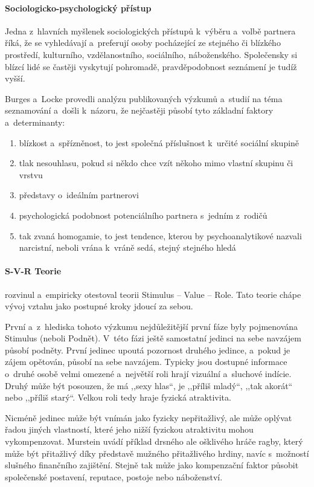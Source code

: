 \documentclass[a4paper, 12pt, notitlepage, oneside, numbers=noenddot]{report}
\begin{document}
\paragraph{Sociologicko-psychologický přístup}
Jedna z~hlavních myšlenek sociologických pří\-stu\-pů \citep{Planava1998}
k~výběru a~volbě partnera říká, že se vyhledávají a~preferují os\-oby
pocházející ze stejného či blízkého prostředí, kulturního,
vzdělanost\-ního, sociál\-ního, nábožen\-ského.  Společensky si blízcí lidé
se častěji vyskytují pohromadě, pravděpodobnost seznámení je tudíž
vyšší.

Burges a~Locke \citep{Planava1998} provedli analýzu publikovaných
výzkumů a~studií na téma seznamování a~došli k~názoru, že nejčastěji
působí tyto základní faktory a~determinanty:

\begin{enumerate}
\item blízkost a~spřízněnost, to jest společná příslušnost k~určité
  sociální skupině
\item tlak nesouhlasu, pokud si někdo chce vzít někoho mimo vlastní
  skupinu či vrstvu
\item představy o~ideálním partnerovi
\item psychologická podobnost potenciálního partnera s~jedním z~rodičů
\item tak zvaná homogamie, to jest tendence, kterou by
  psychoanalytikové nazvali narcistní, neboli vrána k~vráně sedá,
  stejný stejného hledá
\end{enumerate}
\paragraph[S{}--V{}--R Teorie]{S-V-R Teorie}
\citet{Murstein1970} rozvinul a~empiricky otestoval teorii
Stimulus -- Value -- Role. Tato teorie chápe vývoj vztahu jako postupné
kroky jdoucí za sebou.

První a~z~hlediska tohoto výzkumu nejdůležitější první fáze byly
pojmenována Stimulus (neboli Podnět).  V~této fázi ještě samostatní
jedinci na sebe navzájem působí podněty.  První jedinec upoutá
pozornost druhého jedince, a~pokud je zájem opětován, působí na sebe
navzájem.  Typicky jsou dostupné informace o~druhé osobě velmi
omezené a~největší roli hrají vizuální a~sluchové indície. Druhý může
být posouzen, že má ,,sexy hlas``, je ,,příliš mladý``, ,,tak akorát``
nebo ,,příliš starý``.  Velkou roli tedy hraje fyzická atraktivita.

Nicméně jedinec může být vnímán jako fyzicky nepřitažlivý, ale může
oplývat řadou jiných vlastností, které jeho nižší fyzickou atraktivitu
mohou vykompenzovat. Murstein uvádí příklad drsného ale ošklivého
hráče ragby, který může být přitažlivý díky představě mužného
přitažlivého hrdiny, navíc s~možností slušného finančního zajištění.
Stejně tak může jako kompenzační faktor působit společenské postavení,
reputace, postoje nebo náboženství.
\end{document}
